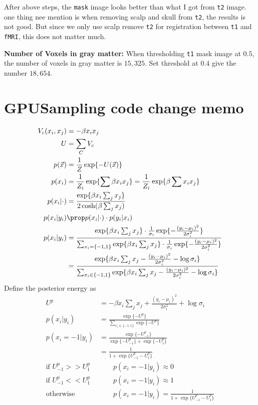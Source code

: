 \documentclass[12pt]{article}
\begin{document}
After above steps, the \texttt{mask} image looks better than what I got from \texttt{t2} image. one thing nee mention is when removing scalp and skull from \texttt{t2}, the results is not good. But since we only use scalp remove \texttt{t2} for registration between \texttt{t1} and \texttt{fMRI}, this does not matter much. 

\textbf{Number of Voxels in gray matter: } When thresholding \texttt{t1} mask image at $0.5$, the number of voxels in gray matter is $15,325$. Set threshold at $0.4$ give the number $18,654$. 

\section{GPUSampling code change memo}
\begin{align*}
  V_c(x_i, x_j) &= -\beta x_i x_j \\
  U &= \sum_C V_c \\
  p(\vec x) &= \frac{1}{Z}\exp\{-U(\vec x)\} \\
  p(x_i) &= \frac{1}{Z_i}\exp\{ \sum \beta x_i x_j\} = \frac{1}{Z_i}\exp\{ \beta \sum x_i x_j\} \\
  p(x_i | \cdot) &= \frac{\exp\{ \beta x_i \sum_j x_j\}}{2\cosh(\beta \sum_j x_j)} \\
  p(x_i | y_i) &\prop p(x_i | \cdot) \cdot p(y_i | x_i) \\
  p(x_i | y_i) &= \frac{\exp\{ \beta x_i \sum_j x_j \} \cdot \frac{1}{\sigma_i} \exp\{ -\frac{(y_i - \mu_i )^2}{2\sigma_i^2}\}}{\sum_{x_i = \{-1, 1\}}\exp\{ \beta x_i \sum_j x_j \} \cdot \frac{1}{\sigma_i} \exp\{ -\frac{(y_i - \mu_i )^2}{2\sigma_i^2}\}} \\
  &= \frac{\exp\{ \beta x_i \sum_j x_j - \frac{(y_i - \mu_i)^2}{2\sigma_i^2} - \log \sigma_i\}}{\sum_{x_i\in \{-1, 1\}} \exp\{ \beta x_i \sum_j x_j - \frac{(y_i - \mu_i)^2}{2\sigma_i^2} - \log \sigma_i\}} \\
\end{align*}
Define the posterior energy as 
\begin{align*}
  U^p &= -\beta x_i \sum_j x_j + \frac{(y_i - \mu_i)^2}{2\sigma_i^2} + \log \sigma_i \\
  p(x_i | y_i) &= \frac{\exp \{ -U^p\}}{\sum_{x_i\in \{-1, 1\}}\exp \{ -U^p\}} \\
  p(x_i = -1 | y_i) &= \frac{\exp\{ -U_{-1}^p\}}{\exp\{ -U_{-1}^p \} + \exp\{ -U_1^p\}} \\
  &= \frac{1}{1 + \exp \{ U_{-1}^p - U_1^p\}} \\
  \mbox{if } U_{-1}^p >> U_1^p & \qquad p(x_i = -1| y_i) \approx 0 \\
  \mbox{if } U_{-1}^p << U_1^p & \qquad p(x_i = -1| y_i) \approx 1 \\
  \mbox{otherwise} &  \qquad   p(x_i = -1 | y_i) = \frac{1}{1 + \exp \{ U_{-1}^p - U_1^p\}} \\
\end{align*}
\end{document}
